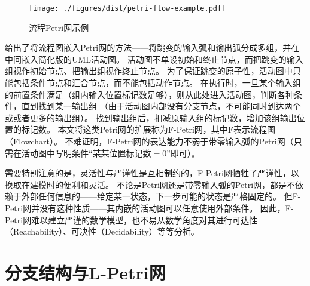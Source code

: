 \documentclass[index]{subfiles}
\begin{document}
\begin{figure}[h]
  \centering
  \texttt{[image: ./figures/dist/petri-flow-example.pdf]}
  \caption{流程Petri网示例\label{fig:petri-flow}}
\end{figure}

给出了将流程图嵌入Petri网的方法——将跳变的输入弧和输出弧分成多组，并在中间嵌入简化版的UML活动图。
活动图不单设初始和终止节点，而把跳变的输入组视作初始节点、把输出组视作终止节点。
为了保证跳变的原子性，活动图中只能包括条件节点和汇合节点，而不能包括动作节点。
在执行时，一旦某个输入组的前置条件满足（组内输入位置标记数足够），则从此处进入活动图，判断各种条件，直到找到某一输出组
（由于活动图内部没有分支节点，不可能同时到达两个或或者更多的输出组）。
找到输出组后，扣减原输入组的标记数，增加该组输出位置的标记数。
本文将这类Petri网的扩展称为F-Petri网，其中F表示流程图（Flowchart）。
不难证明，F-Petri网的表达能力不弱于带零输入弧的Petri网（只需在活动图中写明条件“某某位置标记数$=0$”即可）。

需要特别注意的是，灵活性与严谨性是互相制约的，F-Petri网牺牲了严谨性，以换取在建模时的便利和灵活。
不论是Petri网还是带零输入弧的Petri网，都是不依赖于外部任何信息的——给定某一状态，下一步可能的状态是严格固定的。
但F-Petri网并没有这种性质——其内嵌的活动图可以任意使用外部条件。
因此，F-Petri网难以建立严谨的数学模型，也不易从数学角度对其进行可达性（Reachability）、可决性（Decidability）等等分析。

\section{分支结构与L-Petri网}
\end{document}
